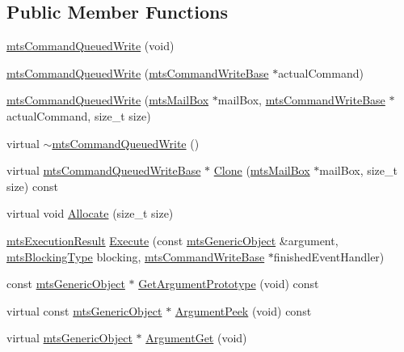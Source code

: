 \subsection*{Public Member Functions}
\begin{DoxyCompactItemize}
\item 
\hyperlink{classmts_command_queued_write_a4858efe1420cb5840040042f1b2ca57a}{mts\-Command\-Queued\-Write} (void)
\item 
\hyperlink{classmts_command_queued_write_a7000aca27b43b4085556e5fbb1fca4f0}{mts\-Command\-Queued\-Write} (\hyperlink{classmts_command_write_base}{mts\-Command\-Write\-Base} $\ast$actual\-Command)
\item 
\hyperlink{classmts_command_queued_write_a380711a5f40d7c15a07cc807c505a3f3}{mts\-Command\-Queued\-Write} (\hyperlink{classmts_mail_box}{mts\-Mail\-Box} $\ast$mail\-Box, \hyperlink{classmts_command_write_base}{mts\-Command\-Write\-Base} $\ast$actual\-Command, size\-\_\-t size)
\item 
virtual \hyperlink{classmts_command_queued_write_a1984fe21945f207e3f7e9e879d16cf67}{$\sim$mts\-Command\-Queued\-Write} ()
\item 
virtual \hyperlink{classmts_command_queued_write_base}{mts\-Command\-Queued\-Write\-Base} $\ast$ \hyperlink{classmts_command_queued_write_a7a083a9a4beb94394cd590c33bc0799a}{Clone} (\hyperlink{classmts_mail_box}{mts\-Mail\-Box} $\ast$mail\-Box, size\-\_\-t size) const 
\item 
virtual void \hyperlink{classmts_command_queued_write_a708715a7f63ed3d31aa8ef57c15d5bcb}{Allocate} (size\-\_\-t size)
\item 
\hyperlink{classmts_execution_result}{mts\-Execution\-Result} \hyperlink{classmts_command_queued_write_aac9bc57a48b9cb773327c1020df0cabf}{Execute} (const \hyperlink{classmts_generic_object}{mts\-Generic\-Object} \&argument, \hyperlink{mts_forward_declarations_8h_ad7426ccb6c883bc780d0ee197dddcbe7}{mts\-Blocking\-Type} blocking, \hyperlink{classmts_command_write_base}{mts\-Command\-Write\-Base} $\ast$finished\-Event\-Handler)
\item 
const \hyperlink{classmts_generic_object}{mts\-Generic\-Object} $\ast$ \hyperlink{classmts_command_queued_write_adf14fc179c04c9532b8f2500550bd37c}{Get\-Argument\-Prototype} (void) const 
\item 
virtual const \hyperlink{classmts_generic_object}{mts\-Generic\-Object} $\ast$ \hyperlink{classmts_command_queued_write_a720c2911ca6dff95951947ee393acb9e}{Argument\-Peek} (void) const 
\item 
virtual \hyperlink{classmts_generic_object}{mts\-Generic\-Object} $\ast$ \hyperlink{classmts_command_queued_write_a6ca68723d7a73d8c2e365a45c9f2518a}{Argument\-Get} (void)
\end{DoxyCompactItemize}

